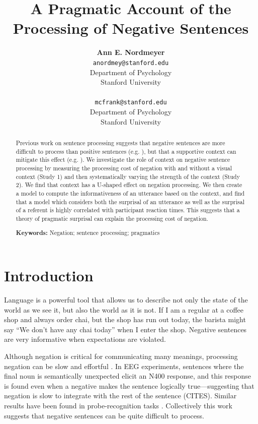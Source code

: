 \documentclass[10pt,letterpaper]{article}
\title{A Pragmatic Account of the Processing of Negative Sentences}
\author{{\large \bf Ann E. Nordmeyer} \\ \texttt{anordmey@stanford.edu}\\ Department of Psychology \\ Stanford University \\ 
\And {\large \bf Michael C. Frank} \\ \texttt{mcfrank@stanford.edu} \\ Department of Psychology \\ Stanford University \\ }
\begin{document}
\maketitle

\begin{abstract}

Previous work on sentence processing suggests that negative sentences are more difficult to process than positive sentences (e.g. ), but that a supportive context can mitigate this effect (e.g. ).  We investigate the role of context on negative sentence processing by measuring the processing cost of negation with and without a visual context (Study 1) and then systematically varying the strength of the context (Study 2).  We find that context has a U-shaped effect on negation processing.  We then create a model to compute the informativeness of an utterance based on the context, and find that a model which considers both the surprisal of an utterance as well as the surprisal of a referent is highly correlated with participant reaction times.  This suggests that a theory of pragmatic surprisal can explain the processing cost of negation.  

\textbf{Keywords:} 
Negation; sentence processing; pragmatics
\end{abstract}

\section{Introduction}


Language is a powerful tool that allows us to describe not only the state of the world as we see it, but also the world as it is not.  If I am a regular at a coffee shop and always order chai, but the shop has run out today, the barista might say ``We don't have any chai today'' when I enter the shop.  Negative sentences are very informative when expectations are violated.

Although negation is critical for communicating many meanings, processing negation can be slow and effortful \cite{hclark1972, carpenter1975, just1971, just1976}. In EEG experiments, sentences where the final noun is semantically unexpected elicit an N400 response, and this response is found even when a negative makes the sentence logically true---suggesting that negation is slow to integrate with the rest of the sentence (CITES).  Similar results have been found in probe-recognition tasks \cite{kaup2003, kaup2006, hasson2006}.  Collectively this work suggests that negative sentences can be quite difficult to process.
 
\end{document}
